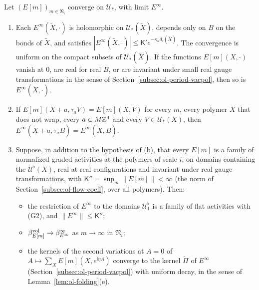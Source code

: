 \begin{lemma}\label{lem:gl-limits}
Let $(E[m])_{m\in\mathfrak N_i}$ converge on $\mathcal U_*$, with limit $E^\infty$.
\begin{enumerate}[label=(\alph*)]
\item Each $E^\infty(\tilde X,\cdot)$ is holomorphic on $\mathcal U_*(\tilde X)$, depends only on $B$ on the bonds of $\tilde X$, and satisfies $|E^\infty(\tilde X,\cdot)|\le\mathsf K'e^{-\kappa_nd_i(\tilde X)}$. The convergence is uniform on the compact subsets of $\mathcal U_*(\tilde X)$. If the functions $E[m](X,\cdot)$ vanish at $0$, are real for real $B$, or are invariant under small real gauge transformations in the sense of Section~\ref{subsec:ol-period-vacpol}, then so is $E^\infty(\tilde X,\cdot)$.
\item If $E[m](X+a,\tau_aV)=E[m](X,V)$ for every $m$, every polymer $X$ that does not wrap, every $a\in M\mathbb Z^4$ and every $V\in\mathcal U_*(X)$, then $E^\infty(\tilde X+a,\tau_aB)=E^\infty(\tilde X,B)$.
\item Suppose, in addition to the hypothesis of (b), that every $E[m]$ is a family of normalized graded activities at the polymers of scale $i$, on domains containing the $\mathcal U^\flat(X)$, real at real configurations and invariant under real gauge transformations, with $\mathsf K''=\sup_m\|E[m]\|<\infty$ (the norm of Section~\ref{subsec:ol-flow-coeff}, over all polymers). Then:
  \begin{itemize}
  \item the restriction of $E^\infty$ to the domains $\mathcal U^\flat_1$ is a family of flat activities with (G2), and $\|E^\infty\|\le\mathsf K''$;
  \item $\beta^{\rm vol}_{E[m]}\to\beta^\infty_{E^\infty}$ as $m\to\infty$ in $\mathfrak N_i$;
  \item the kernels of the second variations at $A=0$ of $A\mapsto\sum_XE[m](X,e^{\ii\eta A})$ converge to the kernel $\widetilde\Pi$ of $E^\infty$ (Section~\ref{subsec:ol-period-vacpol}) with uniform decay, in the sense of Lemma~\ref{lem:ol-folding}(e).
  \end{itemize}
\end{enumerate}
\end{lemma}

